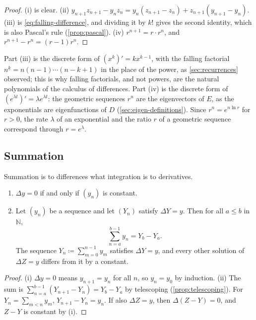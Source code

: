 \begin{proof}
(i) is clear. (ii) $y_{n+1}z_{n+1}-y_nz_n=y_n(z_{n+1}-z_n)+z_{n+1}(y_{n+1}-y_n)$. (iii) is \eqref{eq:falling-difference}, and dividing it by $k!$ gives the second identity, which is also Pascal's rule (\cref{prop:pascal}). (iv) $r^{n+1}=r\cdot r^n$, and $r^{n+1}-r^n=(r-1)r^n$.
\end{proof}

Part (iii) is the discrete form of $(x^k)'=kx^{k-1}$, with the falling factorial $n^{\underline k}=n(n-1)\cdots(n-k+1)$ in the place of the power, as \cref{sec:recurrences} observed; this is why falling factorials, and not powers, are the natural polynomials of the calculus of differences. Part (iv) is the discrete form of $(e^{\lambda t})'=\lambda e^{\lambda t}$: the geometric sequences $r^n$ are the eigenvectors of $E$, as the exponentials are eigenfunctions of $D$ (\cref{sec:eigen-definitions}). Since $r^n=e^{n\ln r}$ for $r>0$, the rate $\lambda$ of an exponential and the ratio $r$ of a geometric sequence correspond through $r=e^\lambda$.

\subsection{Summation}

Summation is to differences what integration is to derivatives.

\begin{theorem}
\label{thm:summation}
\leavevmode
\begin{enumerate}
\item $\Delta y=0$ if and only if $(y_n)$ is constant.
\item Let $(y_n)$ be a sequence and let $(Y_n)$ satisfy $\Delta Y=y$. Then for all $a\le b$ in $\mathbb N$,
\[
\sum_{n=a}^{b-1}y_n=Y_b-Y_a .
\]
The sequence $Y_n\coloneqq\sum_{m=0}^{n-1}y_m$ satisfies $\Delta Y=y$, and every other solution of $\Delta Z=y$ differs from it by a constant.
\end{enumerate}
\end{theorem}

\begin{proof}
(i) $\Delta y=0$ means $y_{n+1}=y_n$ for all $n$, so $y_n=y_0$ by induction. (ii) The sum is $\sum_{n=a}^{b-1}(Y_{n+1}-Y_n)=Y_b-Y_a$ by telescoping (\cref{prop:telescoping}). For $Y_n=\sum_{m<n}y_m$, $Y_{n+1}-Y_n=y_n$. If also $\Delta Z=y$, then $\Delta(Z-Y)=0$, and $Z-Y$ is constant by (i).
\end{proof}

